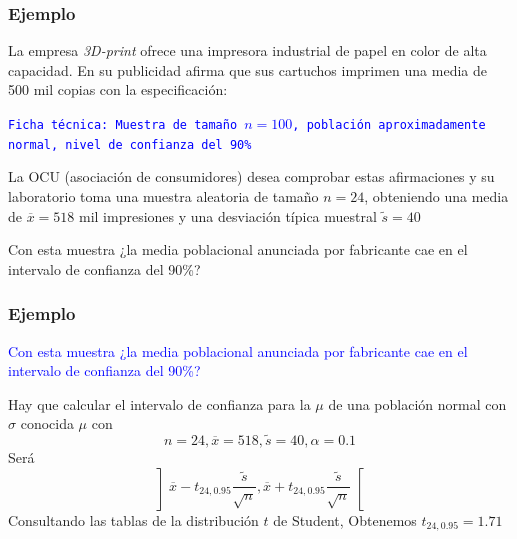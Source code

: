 \documentclass[12pt,t]{beamer}\usepackage[]{graphicx}\usepackage[]{color}
\newcommand{\blue}[1]{\textcolor{blue}{#1}}
\theoremstyle{plain}
\theoremstyle{definition}
\begin{document}
%
%
%
%
%
%
%
%
%




\begin{frame}
\frametitle{Ejemplo}

La empresa \textsl{3D-print} ofrece una impresora industrial de papel en color de alta capacidad. En su publicidad afirma que sus cartuchos imprimen una media de 500 mil copias con la especificación: 
\medskip

\blue{\texttt{Ficha técnica: Muestra de  tamaño  $n=100$,
población aproximadamente normal, nivel de confianza  del 90\%}}
\medskip 

La OCU (asociación de consumidores) desea comprobar estas  afirmaciones y su laboratorio toma una muestra aleatoria de  tamaño  $n=24$, obteniendo una media de $\overline{x}=518$ mil impresiones y una desviación típica muestral 
$\widetilde{s}=40$
\medskip

Con esta muestra ¿la media   poblacional anunciada por fabricante cae en el  intervalo de confianza  del 90\%?
\end{frame}

\begin{frame}[fragile]
\frametitle{Ejemplo}


\blue{Con esta muestra ¿la media   poblacional anunciada por fabricante cae en el  intervalo de confianza  del 90\%?}

Hay que  calcular el intervalo de confianza  para la $\mu$ de una población normal con $\sigma$ conocida $\mu$ con 
$$
n=24, \overline{x}=518, \widetilde{s}=40, \alpha=0.1
$$
Será
$$
\left] 
\overline{x}-t_{24,0.95} \frac{\widetilde{s}}{\sqrt{n}},
\overline{x}+t_{24,0.95} \frac{\widetilde{s}}{\sqrt{n}}\right[
$$
Consultando las tablas de la distribución  $t$ de Student, Obtenemos $t_{24,0.95}=1.71$
\end{frame}
\end{document}
